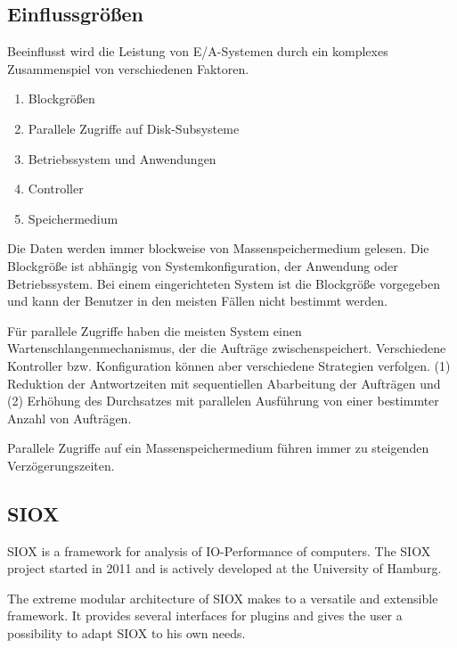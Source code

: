 \subsection{Einflussgrößen}
Beeinflusst wird die Leistung von E/A-Systemen durch ein komplexes Zusammenspiel von verschiedenen Faktoren.

\begin{enumerate}
	\item Blockgrößen
	\item Parallele Zugriffe auf Disk-Subsysteme
	\item Betriebssystem und Anwendungen
	\item Controller
	\item Speichermedium
\end{enumerate}

Die Daten werden immer blockweise von Massenspeichermedium gelesen. Die Blockgröße ist abhängig von Systemkonfiguration, der Anwendung oder Betriebssystem. Bei einem eingerichteten System ist die Blockgröße vorgegeben und kann der Benutzer in den meisten Fällen nicht bestimmt werden. 

Für parallele Zugriffe haben die meisten System einen Wartenschlangenmechanismus, der die Aufträge zwischenspeichert. Verschiedene Kontroller bzw. Konfiguration können aber verschiedene Strategien verfolgen. (1) Reduktion der Antwortzeiten mit sequentiellen Abarbeitung der Aufträgen und (2) Erhöhung des Durchsatzes mit parallelen Ausführung von einer bestimmter Anzahl von Aufträgen.

Parallele Zugriffe auf ein Massenspeichermedium führen immer zu steigenden Verzögerungszeiten.



\subsection{SIOX}

SIOX is a framework for analysis of IO-Performance of computers. The SIOX project started in 2011 and is actively developed at the University of Hamburg. 

The extreme modular architecture of SIOX makes to a versatile and extensible framework. It provides several interfaces for plugins and gives the user a possibility to adapt SIOX to his own needs.
